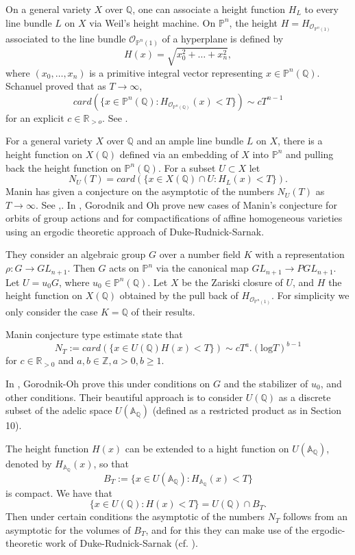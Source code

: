 \documentclass[12pt]{amsart}
\def\A{\mathbb{A}}
\def\R{\mathbb{R}}
\def\P{\mathbb{P}}
\def\Z{\mathbb{Z}}
\def\R{\mathbb{R}}
\def\Q{\mathbb{Q}}
\def\cO{\mathcal{O}}
\numberwithin{equation}{section}
\begin{document}
On a general variety $X$ over $\Q$, one can associate a height function $H_L$ to every line bundle $L$ on $X$ via 
Weil's height machine. On $\P^n$, the height $H=H_{\cO_{\P^n(1)}}$ associated to the line bundle 
$\cO_{\P^n(1)}$ of a hyperplane is defined by 
$$H(x)=\sqrt{x_0^2+\dots+x_n^2},$$
where $(x_0,\dots,x_n)$ is a primitive integral vector representing $x\in \P^n(\Q)$. Schanuel proved that as $T\rightarrow \infty$,
$$card(\{x\in \P^n(\Q): H_{\cO_{\P^n(\Q)}}(x)<T\}) \sim cT^{n-1}$$
for an explicit $c\in \R_{>o}$. See \cite{manin-book}.

For a general variety $X$ over $\Q$ and an ample line bundle $L$ on $X$, there is a height function on $X(\Q)$ defined
via an embedding of $X$ into $\P^n$ and pulling back the height function on $\P^n(\Q)$. For a subset $U\subset X$ let
$$N_U(T)=card(\{x\in X(\Q) \cap U: H_L(x)<T\}).$$
Manin has given a conjecture on the asymptotic of the numbers $N_U(T)$ as $T\rightarrow \infty$. See \cite{manin-book},\cite{GO}. In \cite{GO}, Gorodnik and Oh prove new cases of Manin's conjecture for orbits of group actions and for compactifications of affine homogeneous varieties using an ergodic theoretic approach of Duke-Rudnick-Sarnak. 

They consider an algebraic group $G$ over a number field $K$ with a representation $\rho:G \rightarrow GL_{n+1}$. Then $G$ acts on $\P^n$ via the canonical map $GL_{n+1} \rightarrow PGL_{n+1}$. 
Let $U=u_0G$, where $u_0\in \P^n(\Q)$. Let $X$ be the Zariski closure of $U$, and $H$ the height 
function on $X(\Q)$ obtained by the pull back of $H_{\cO_{\P^n(1)}}$. For simplicity we only consider the case $K=\Q$ of their results. 

Manin conjecture type estimate state that
$$N_T:=card(\{x\in U(\Q) H(x)<T\}) \sim cT^a.(\mathrm{log} T)^{b-1}$$
for $c\in \R_{>0}$ and $a,b\in \Z, a>0, b\geq 1$.

In \cite{GO}, Gorodnik-Oh prove this under conditions on $G$ and the stabilizer of $u_0$, and other conditions. 
Their beautiful approach is 
to consider $U(\Q)$ as a discrete subset of the adelic space $U(\A_{\Q})$ (defined as a restricted product as in Section 10). 

The height function $H(x)$ can be extended to a hight function on $U(\A_{\Q})$, denoted by $H_{\A_{\Q}}(x)$, so that
$$B_T:=\{x\in U(\A_{\Q}): H_{\A_{\Q}}(x)<T\}$$
is compact. We have that
$$\{x\in U(\Q): H(x)<T\}=U(\Q)\cap B_T.$$
Then under certain conditions the asymptotic of the numbers $N_T$ follows from an asymptotic for the volumes of $B_T$, and for this they can 
make use of the ergodic-theoretic work of Duke-Rudnick-Sarnak (cf. \cite{GO}).
\end{document}

